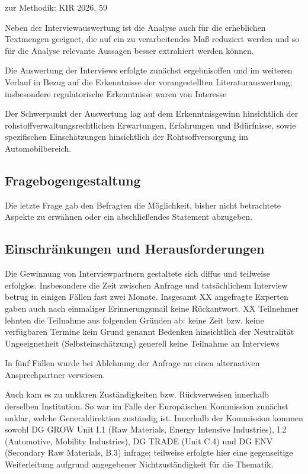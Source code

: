 \documentclass[12pt,a4paper,oneside]{book} %
\begin{document}
zur Methodik: KIR 2026, 59

Neben der Interviewauswertung ist die Analyse auch für die erheblichen Textmengen geeignet, die auf ein zu verarbeitendes Maß reduziert werden und so für die Analyse relevante Aussagen besser extrahiert werden können.

Die Auswertung der Interviews erfolgte zunächst ergebnisoffen und im weiteren Verlauf in Bezug auf die Erkenntnisse der vorangestellten Literaturauswertung; insbesondere regulatorische Erkenntnisse waren von Interesse

Der Schwerpunkt der Auswertung lag auf dem Erkenntnisgewinn hinsichtlich der rohstoffverwaltungsrechtlichen Erwartungen, Erfahrungen und Bdürfnisse, sowie spezifischen Einschätzungen hinsichtlich der Rohtsoffversorgung im Automobilbereich.

\subsection{Fragebogengestaltung}

Die letzte Frage gab den Befragten die Möglichkeit, bisher nicht betrachtete Aspekte zu erwähnen oder ein abschließendes Statement abzugeben.

\subsection{Einschränkungen und Herausforderungen}

Die Gewinnung von Interviewpartnern gestaltete sich diffus und teilweise erfolglos. Insbesondere die Zeit zwischen Anfrage und tatsächlichem Interview betrug in einigen Fällen fast zwei Monate. Insgesamt XX angefragte Experten gaben auch nach einmaliger Erinnerungsmail keine Rückantwort. XX Teilnehmer lehnten die Teilnahme aus folgenden Gründen ab:
keine Zeit bzw. keine verfügbaren Termine
kein Grund genannt
Bedenken hinsichtlich der Neutralität
Ungeeignetheit (Selbsteinschätzung)
generell keine Teilnahme an Interviews

In fünf Fällen wurde bei Ablehnung der Anfrage an einen alternativen Ansprechpartner verwiesen.

Auch kam es zu unklaren Zuständigkeiten bzw. Rückverweisen innerhalb derselben Institution. So war im Falle der Europäischen Kommission zunächst unklar, welche Generaldirektion zuständig ist.
Innerhalb der Kommission  kommen sowohl DG GROW Unit I.1 (Raw Materials, Energy Intensive Industries), I.2 (Automotive, Mobility Industries), DG TRADE (Unit C.4) und DG ENV (Secondary Raw Materials, B.3) infrage; teilweise erfolgte hier eine gegenseitige Weiterleitung aufgrund angegebener Nichtzuständigkeit für die Thematik.
\end{document}
